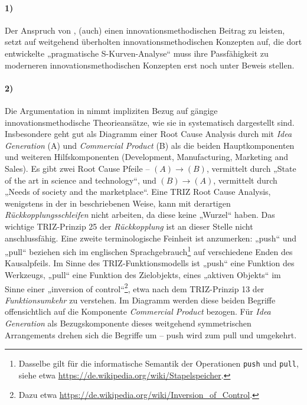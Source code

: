 \documentclass[12pt,a4paper]{article}
\begin{document}
\paragraph{1)}
Der Anspruch von \cite{TESE2018}, (auch) einen innovationsmethodischen Beitrag
zu leisten, setzt auf weitgehend überholten innovationsmethodischen Konzepten
auf, die dort entwickelte „pragmatische S-Kurven-Analyse“ muss ihre
Passfähigkeit zu moderneren innovationsmethodischen Konzepten erst noch unter
Beweis stellen.

\paragraph{2)}
Die Argumentation in \cite{TESE2018} nimmt impliziten Bezug auf gängige
innovationsmethodische Theorieansätze, wie sie in \cite{Preez2006}
systematisch dargestellt sind.  Insbesondere \cite[Fig. 3]{Preez2006} geht gut
als Diagramm einer Root Cause Analysis durch mit \emph{Idea Generation} (A)
und \emph{Commercial Product} (B) als die beiden Hauptkomponenten und weiteren
Hilfskomponenten (Development, Manufacturing, Marketing and Sales).  Es gibt
zwei Root Cause Pfeile -- $(A) \longrightarrow (B)$, vermittelt durch „State
of the art in science and technology“, und $(B) \longrightarrow (A)$,
vermittelt durch „Needs of society and the marketplace“. Eine TRIZ Root Cause
Analysis, wenigstens in der in \cite[Kap. 4.7]{KS2017} beschriebenen Weise,
kann mit derartigen \emph{Rückkopplungsschleifen} nicht arbeiten, da diese
keine „Wurzel“ haben. Das wichtige TRIZ-Prinzip 25 der \emph{Rückkopplung} ist
an dieser Stelle nicht anschlussfähig.  Eine zweite terminologische Feinheit
ist anzumerken: „push“ und „pull“ beziehen sich im englischen
Sprachgebrauch\footnote{Dasselbe gilt für die informatische Semantik der
  Operationen \texttt{push} und \texttt{pull}, siehe etwa
  \url{https://de.wikipedia.org/wiki/Stapelspeicher}. } auf verschiedene Enden
des Kausalpfeils. Im Sinne des TRIZ-Funktionsmodells \cite[Kap. 4.4]{KS2017}
ist „push“ eine Funktion des Werkzeugs, „pull“ eine Funktion des Zielobjekts,
eines „aktiven Objekts“ im Sinne einer „inversion of control“\footnote{Dazu
  etwa \url{https://de.wikipedia.org/wiki/Inversion_of_Control}.}, etwa nach
dem TRIZ-Prinzip 13 der \emph{Funktionsumkehr} zu verstehen.  Im Diagramm
\cite[Fig. 3]{Preez2006} werden diese beiden Begriffe offensichtlich auf die
Komponente \emph{Commercial Product} bezogen.  Für \emph{Idea Generation} als
Bezugskomponente dieses weitgehend symmetrischen Arrangements drehen sich die
Begriffe um -- push wird zum pull und umgekehrt.
\end{document}
